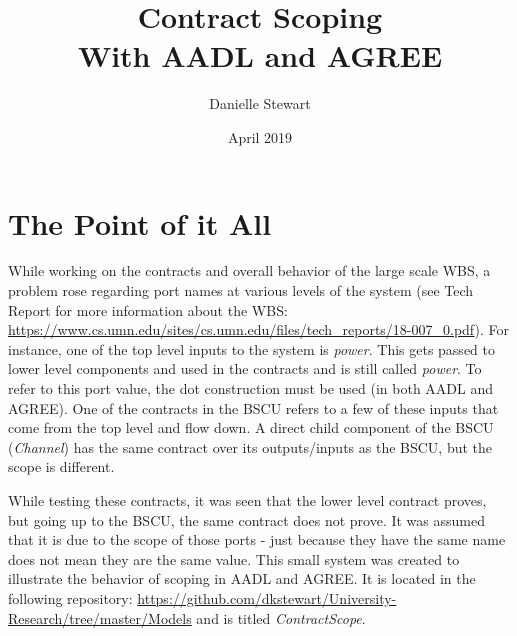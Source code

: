 \documentclass{article}
\title{Contract Scoping \\ With AADL and AGREE } %
\author{Danielle Stewart} %
\date{April 2019} %
\begin{document}
\maketitle %





\section{The Point of it All}

While working on the contracts and overall behavior of the large scale WBS, a problem rose regarding port names at various levels of the system (see Tech Report for more information about the WBS: \url{https://www.cs.umn.edu/sites/cs.umn.edu/files/tech_reports/18-007_0.pdf}). For instance, one of the top level inputs to the system is \textit{power}. This gets passed to lower level components and used in the contracts and is still called \textit{power}. To refer to this port value, the dot construction must be used (in both AADL and AGREE). One of the contracts in the BSCU refers to a few of these inputs that come from the top level and flow down. A direct child component of the BSCU (\textit{Channel}) has the same contract over its outputs/inputs as the BSCU, but the scope is different. 

While testing these contracts, it was seen that the lower level contract proves, but going up to the BSCU, the same contract does not prove. It was assumed that it is due to the scope of those ports - just because they have the same name does not mean they are the same value. This small system was created to illustrate the behavior of scoping in AADL and AGREE. It is located in the following repository: \url{https://github.com/dkstewart/University-Research/tree/master/Models} and is titled \textit{ContractScope}.
\end{document}

